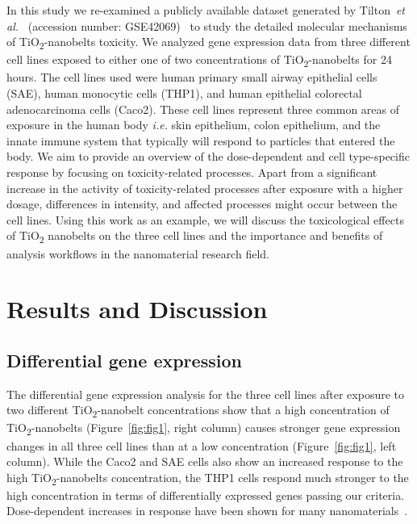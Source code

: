 \documentclass[ijms,article,submit,moreauthors,pdftex]{Definitions/mdpi}
\begin{document}
In this study we re-examined a publicly available dataset generated by Tilton~\textit{et al.}~\cite{Tilton2013} (accession number: GSE42069)~\cite{Edgar2002} to study the detailed molecular mechanisms of TiO\textsubscript{2}-nanobelts toxicity. We analyzed gene expression data from three different cell lines exposed to either one of two concentrations of TiO\textsubscript{2}-nanobelts for 24 hours. The cell lines used were human primary small airway epithelial cells (SAE), human monocytic cells (THP1), and human epithelial colorectal adenocarcinoma cells (Caco2). These cell lines represent three common areas of exposure in the human body \textit{i.e.} skin epithelium, colon epithelium, and the innate immune system that typically will respond to particles that entered the body. We aim to provide an overview of the dose-dependent and cell type-specific response by focusing on toxicity-related processes. Apart from a significant increase in the activity of toxicity-related processes after exposure with a higher dosage, differences in intensity, and affected processes might occur between the cell lines. Using this work as an example, we will discuss the toxicological effects of TiO\textsubscript{2} nanobelts on the three cell lines and the importance and benefits of analysis workflows in the nanomaterial research field.
 
\section{Results and Discussion}

\subsection*{Differential gene expression}
The differential gene expression analysis for the three cell lines after exposure to two different TiO\textsubscript{2}-nanobelt concentrations show that a high concentration of TiO\textsubscript{2}-nanobelts (Figure~\ref{fig:fig1}, right column) causes stronger gene expression changes in all three cell lines than at a low concentration (Figure~\ref{fig:fig1}, left column). While the Caco2 and SAE cells also show an increased response to the high TiO\textsubscript{2}-nanobelts concentration, the THP1 cells respond much stronger to the high concentration in terms of differentially expressed genes passing our criteria. Dose-dependent increases in response have been shown for many nanomaterials~\cite{Iavicoli2018,Ding2005}.
\end{document}
